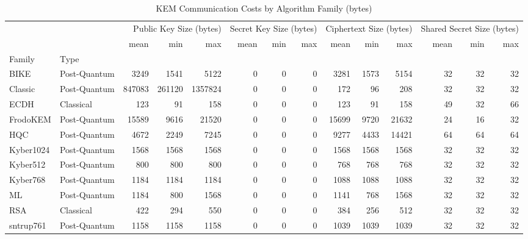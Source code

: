 \begin{table}
\caption{KEM Communication Costs by Algorithm Family (bytes)}
\label{tab:kem_comm_costs}
\begin{tabular}{llrrrrrrrrrrrr}
\toprule
 &  & \multicolumn{3}{r}{Public Key Size (bytes)} & \multicolumn{3}{r}{Secret Key Size (bytes)} & \multicolumn{3}{r}{Ciphertext Size (bytes)} & \multicolumn{3}{r}{Shared Secret Size (bytes)} \\
 &  & mean & min & max & mean & min & max & mean & min & max & mean & min & max \\
Family & Type &  &  &  &  &  &  &  &  &  &  &  &  \\
\midrule
BIKE & Post-Quantum & 3249 & 1541 & 5122 & 0 & 0 & 0 & 3281 & 1573 & 5154 & 32 & 32 & 32 \\
\cline{1-14}
Classic & Post-Quantum & 847083 & 261120 & 1357824 & 0 & 0 & 0 & 172 & 96 & 208 & 32 & 32 & 32 \\
\cline{1-14}
ECDH & Classical & 123 & 91 & 158 & 0 & 0 & 0 & 123 & 91 & 158 & 49 & 32 & 66 \\
\cline{1-14}
FrodoKEM & Post-Quantum & 15589 & 9616 & 21520 & 0 & 0 & 0 & 15699 & 9720 & 21632 & 24 & 16 & 32 \\
\cline{1-14}
HQC & Post-Quantum & 4672 & 2249 & 7245 & 0 & 0 & 0 & 9277 & 4433 & 14421 & 64 & 64 & 64 \\
\cline{1-14}
Kyber1024 & Post-Quantum & 1568 & 1568 & 1568 & 0 & 0 & 0 & 1568 & 1568 & 1568 & 32 & 32 & 32 \\
\cline{1-14}
Kyber512 & Post-Quantum & 800 & 800 & 800 & 0 & 0 & 0 & 768 & 768 & 768 & 32 & 32 & 32 \\
\cline{1-14}
Kyber768 & Post-Quantum & 1184 & 1184 & 1184 & 0 & 0 & 0 & 1088 & 1088 & 1088 & 32 & 32 & 32 \\
\cline{1-14}
ML & Post-Quantum & 1184 & 800 & 1568 & 0 & 0 & 0 & 1141 & 768 & 1568 & 32 & 32 & 32 \\
\cline{1-14}
RSA & Classical & 422 & 294 & 550 & 0 & 0 & 0 & 384 & 256 & 512 & 32 & 32 & 32 \\
\cline{1-14}
sntrup761 & Post-Quantum & 1158 & 1158 & 1158 & 0 & 0 & 0 & 1039 & 1039 & 1039 & 32 & 32 & 32 \\
\cline{1-14}
\bottomrule
\end{tabular}
\end{table}
